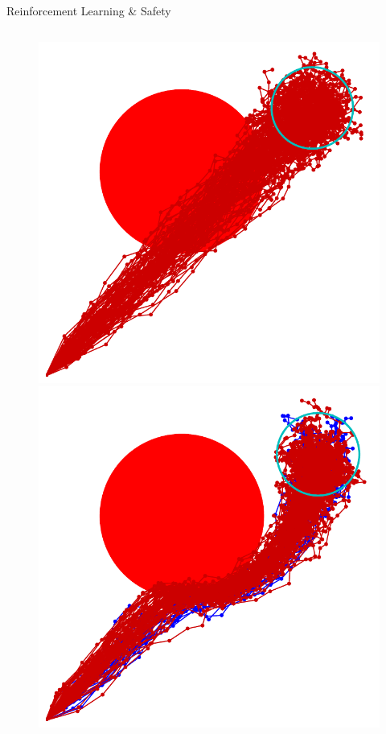 \documentclass[lecture]{beamer}
\begin{document}
\begin{frame}{\normalsize Reinforcement Learning \& Safety}
\begin{columns}
  \begin{overlayarea}{\textwidth}{.55\textheight}
    \begin{figure}
     \newcommand{\FS}{1}
        {
        \center
	\includegraphics[width=1\textwidth,clip]{Codes/RL/RLSafety0.pdf}
	}
	      \only<4>
        {
        \center
	\includegraphics[width=1\textwidth,clip]{Codes/RL/RLSafety1.pdf}
}
\end{figure}
\end{overlayarea}
\end{columns}
\end{frame}
\end{document}
